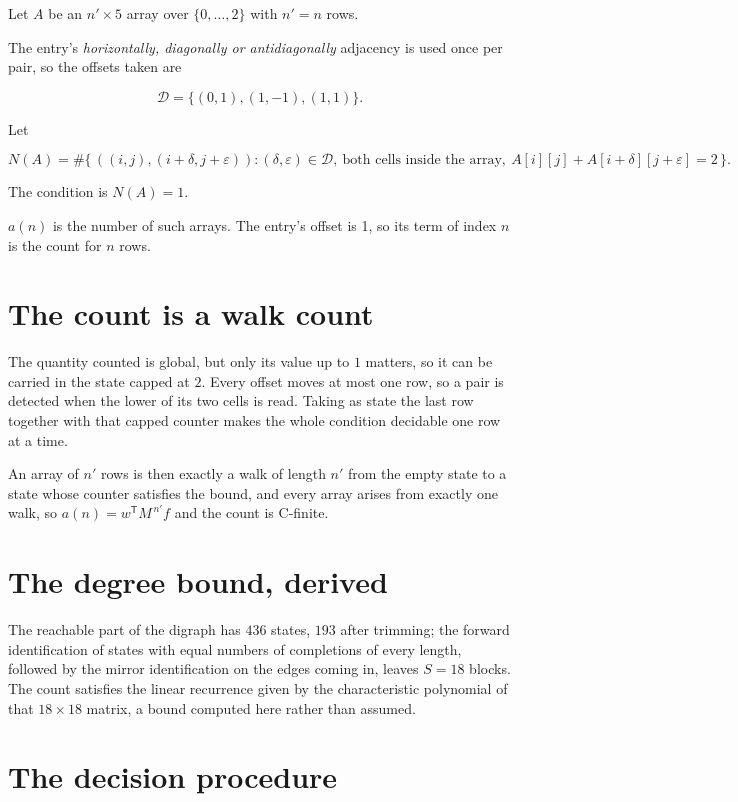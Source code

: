 \documentclass[11pt]{article}
\theoremstyle{definition}
\begin{document}
Let $A$ be an $n' \times 5$ array over $\{0,\dots,2\}$ with $n' = n$ rows.

The entry's {\itshape horizontally, diagonally or antidiagonally} adjacency is used once per pair, so the offsets taken are

\[\mathcal{D} = \{(0,1), (1,-1), (1,1)\}.\]

Let

\[N(A) = \#\bigl\{\,((i,j),(i{+}\delta,j{+}\varepsilon)) : (\delta,\varepsilon) \in \mathcal{D},\ \text{both cells inside the array},\ A[i][j] + A[i{+}\delta][j{+}\varepsilon] = 2\,\bigr\}.\]

The condition is $N(A) = 1$.

$a(n)$ is the number of such arrays. The entry's offset is 1, so its term of index $n$ is the count for $n$ rows.

\section{The count is a walk count}

The quantity counted is global, but only its value up to $1$ matters, so it can be carried in the state capped at $2$. Every offset moves at most one row, so a pair is detected when the lower of its two cells is read. Taking as state the last row together with that capped counter makes the whole condition decidable one row at a time.

An array of $n'$ rows is then exactly a walk of length $n'$ from the empty state to a state whose counter satisfies the bound, and every array arises from exactly one walk, so $a(n) = w^{\mathsf T}M^{\,n'}f$ and the count is C-finite.

\section{The degree bound, derived}

The reachable part of the digraph has $436$ states, $193$ after trimming; the forward identification of states with equal numbers of completions of every length, followed by the mirror identification on the edges coming in, leaves $S = 18$ blocks. The count satisfies the linear recurrence given by the characteristic polynomial of that $18\times18$ matrix, a bound computed here rather than assumed.

\section{The decision procedure}
\end{document}
